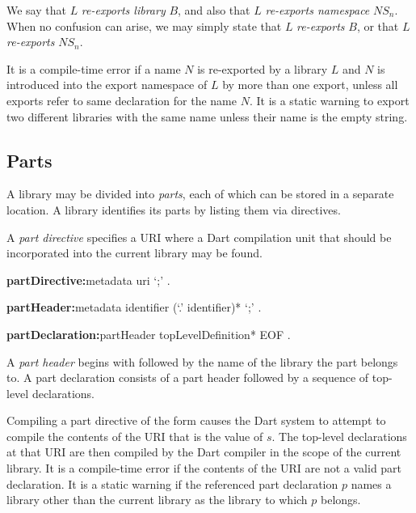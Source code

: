 \documentclass{article}
\begin{document}

\LMHash{}
We say that $L$ {\em re-exports library } $B$, and also that $L$ {\em re-exports namespace } $NS_n$.
When no confusion can arise, we may simply state that $L$ {\em re-exports }$B$, or that $L$ {\em re-exports }$NS_n$.

\LMHash{}
It is a compile-time error if a name $N$ is re-exported by a library $L$ and $N$ is introduced into the export namespace of $L$ by more than one export, unless all exports refer to same declaration for the name $N$.
It is a static warning to export two different libraries with the same name unless their name is the empty string.


\subsection{Parts}

\LMHash{}
A library may be divided into {\em parts}, each of which can be stored in a separate location.
A library identifies its parts by listing them via \PART{} directives.

\LMHash{}
A {\em part directive} specifies a URI where a Dart compilation unit that should be incorporated into the current library may be found.

\begin{grammar}
{\bf partDirective:}metadata \PART{} uri `{\escapegrammar ;}'
  .

{\bf partHeader:}metadata \PART{} \OF{} identifier (`{\escapegrammar .}' identifier)* `{\escapegrammar ;}'
  .

{\bf partDeclaration:}partHeader topLevelDefinition* EOF
  .
\end{grammar}

\LMHash{}
A {\em part header} begins with \PART{} \OF{} followed by the name of the library the part belongs to.
A part declaration consists of a part header followed by a sequence of top-level declarations.

\LMHash{}
Compiling a part directive of the form  causes the Dart system to attempt to compile the contents of the URI that is the value of $s$.
The top-level declarations at that URI are then compiled by the Dart compiler in the scope of the current library.
It is a compile-time error if the contents of the URI are not a valid part declaration.
It is a static warning if the referenced part declaration $p$ names a library other than the current library as the library to which $p$ belongs.
\end{document}
